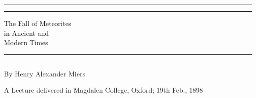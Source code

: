 \documentclass[a4paper, 12pt, oneside]{article}
\begin{document}
\begin{titlepage} %
	\centering %
	\scshape %

	
	\rule{\textwidth}{1.6pt}\vspace*{-\baselineskip}\vspace*{2pt} %
	\rule{\textwidth}{0.4pt} %
	
	\vspace{0.75\baselineskip} %

        {\LARGE The Fall of Meteorites \\ in Ancient and \\ Modern Times} %
	
	\vspace{0.75\baselineskip} %
	
	\rule{\textwidth}{0.4pt}\vspace*{-\baselineskip}\vspace{3.2pt} %
	\rule{\textwidth}{1.6pt} %
	
	\vspace{1\baselineskip} %
	
	
	{\large By Henry Alexander Miers} %
	
	\vspace*{1\baselineskip} %
	
	
	\vspace{1\baselineskip} %

        {\small A Lecture delivered in Magdalen College, Oxford; 19th Feb., 1898}
	
	
		

\end{titlepage}
\end{document}
